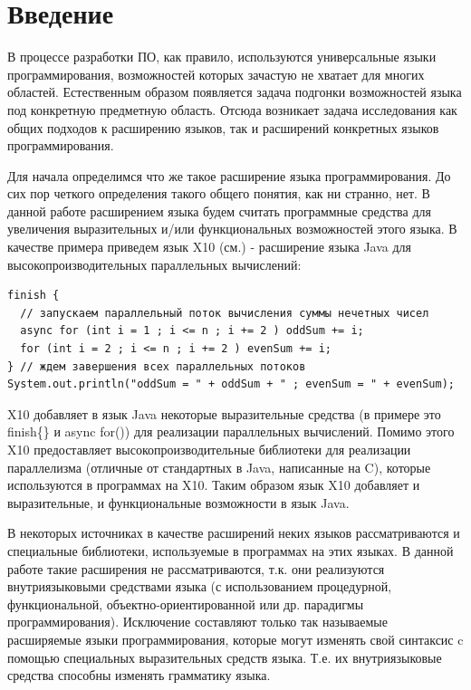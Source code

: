 \documentclass[a4paper,12pt,titlepage]{extarticle}
\begin{document}
\setcounter{page}{3}
\renewcommand{\contentsname}{Оглавление}
\tableofcontents

\pagebreak

\section{Введение}

В процессе разработки ПО, как правило, используются универсальные языки
программирования, возможностей которых зачастую не хватает для многих областей.
Естественным образом появляется задача подгонки возможностей языка под
конкретную предметную область. Отсюда возникает задача исследования как общих
подходов к расширению языков, так и расширений конкретных языков
программирования.

Для начала определимся что же такое расширение языка программирования. До сих
пор четкого определения такого общего понятия, как ни странно, нет. В данной
работе расширением языка будем считать программные средства для увеличения
выразительных и/или функциональных возможностей этого языка. В
качестве примера приведем язык X10 (см.\cite{x10}) - расширение языка Java для
высокопроизводительных параллельных вычислений:
\begin{verbatim}
finish {
  // запускаем параллельный поток вычисления суммы нечетных чисел
  async for (int i = 1 ; i <= n ; i += 2 ) oddSum += i;
  for (int i = 2 ; i <= n ; i += 2 ) evenSum += i;
} // ждем завершения всех параллельных потоков
System.out.println("oddSum = " + oddSum + " ; evenSum = " + evenSum);
\end{verbatim}
X10 добавляет в язык Java некоторые выразительные средства (в
примере это finish\{\} и async for()) для реализации параллельных вычислений.
Помимо этого X10 предоставляет высокопроизводительные библиотеки для реализации
параллелизма (отличные от стандартных в Java, написанные на C), которые
используются в программах на X10. Таким образом язык X10 добавляет и выразительные, и
функциональные возможности в язык Java.

В некоторых источниках в качестве расширений неких языков рассматриваются и
специальные библиотеки, используемые в программах на этих языках. В данной
работе такие расширения не рассматриваются, т.к. они реализуются внутриязыковыми средствами
языка (с использованием процедурной, функциональной, объектно-ориентированной
или др. парадигмы программирования).
Исключение составляют только так называемые расширяемые языки программирования,
которые могут изменять свой синтаксис c помощью специальных выразительных
средств языка. Т.е. их внутриязыковые средства способны изменять грамматику
языка.
\end{document}
